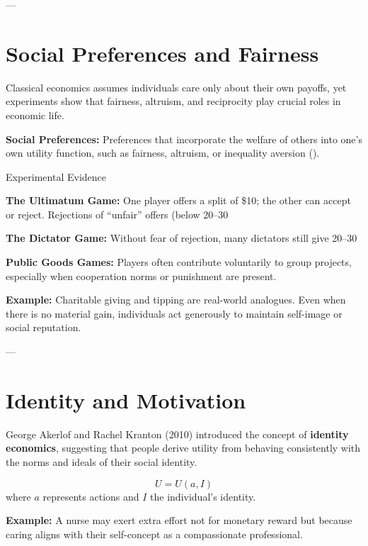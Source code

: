\documentclass[11pt]{book}
\begin{document}
---

\section*{Social Preferences and Fairness}

Classical economics assumes individuals care only about their own payoffs, yet experiments show that fairness, altruism, and reciprocity play crucial roles in economic life.

\begin{definitionbox}
\textbf{Social Preferences:} Preferences that incorporate the welfare of others into one’s own utility function, such as fairness, altruism, or inequality aversion (\citealp{FehrSchmidt1999}).
\end{definitionbox}

Experimental Evidence

\textbf{The Ultimatum Game:}  
One player offers a split of \$10; the other can accept or reject. Rejections of ``unfair'' offers (below 20–30 %

\textbf{The Dictator Game:}  
Without fear of rejection, many dictators still give 20–30 %

\textbf{Public Goods Games:}  
Players often contribute voluntarily to group projects, especially when cooperation norms or punishment are present.

\begin{examplebox}
\textbf{Example:}  
Charitable giving and tipping are real-world analogues. Even when there is no material gain, individuals act generously to maintain self-image or social reputation.
\end{examplebox}

---

\section*{Identity and Motivation}

George Akerlof and Rachel Kranton (2010) introduced the concept of \textbf{identity economics}, suggesting that people derive utility from behaving consistently with the norms and ideals of their social identity.

\[
U = U(a, I)
\]
where \(a\) represents actions and \(I\) the individual’s identity.

\begin{examplebox}
\textbf{Example:}  
A nurse may exert extra effort not for monetary reward but because caring aligns with their self-concept as a compassionate professional.
\end{examplebox}
\end{document}
